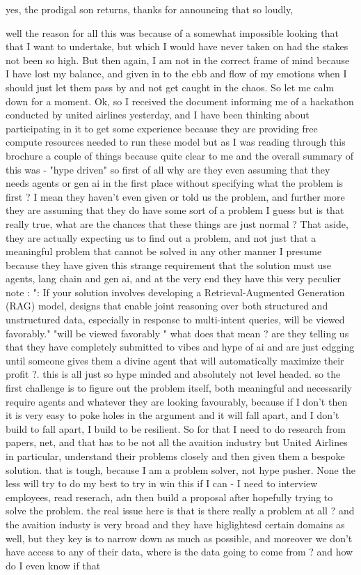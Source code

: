 
yes, the prodigal son returns, thanks for announcing that so loudly,

well the reason for all this was because of a somewhat impossible looking that that I want to undertake, but which I would have never taken on had the stakes not been so high. But then again, I am not in the correct frame of mind because I have lost my balance, and given in to the ebb and flow of my emotions when I should just let them pass by and not get caught in the chaos. So let me calm down for a moment. Ok, so I received the document informing me of a hackathon conducted by united airlines yesterday, and I have been thinking about participating in it to get some experience because they are providing free compute resources needed to run these model but as I was reading through this brochure a couple of things because quite clear to me and the overall summary of this was - "hype driven" so first of all why are they even assuming that they needs agents or gen ai in the first place without specifying what the problem is first ? I mean they haven't even given or told us the problem, and further more they are assuming that they do have some sort of a problem I guess but is that really true, what are the chances that these things are just normal ? That aside, they are actually expecting us to find out a problem, and not just that a meaningful problem that cannot be solved in any other manner I presume because they have given this strange requirement that the solution must use agents, lang chain and gen ai, and at the very end they have this very peculier note : ": If your solution involves developing a Retrieval-Augmented Generation (RAG) model, designs that enable joint reasoning over both structured and unstructured data, especially in response to multi-intent queries, will be viewed favorably." "will be viewed favorably " what does that mean ? are they telling us that they have completely submitted to vibes and hype of ai and are just edgging until someone gives them a divine agent that will automatically maximize their profit ?. this is all just so hype minded and absolutely not level headed. so the first challenge is to figure out the problem itself, both meaningful and necessarily require agents and whatever they are looking favourably, because if I don't then it is very easy to poke holes in the argument and it will fall apart, and I don't build to fall apart, I build to be resilient. So for that I need to do research from papers, net, and that has to be not all the avaition industry but United Airlines in particular, understand their problems closely and then given them a bespoke solution. that is tough, because I am a problem solver, not hype pusher. None the less will try to do my best to try in win this if I can - I need to interview employees, read reserach, adn then build a proposal after hopefully trying to solve the problem. the real issue here is that is there really a problem at all ? and the avaition industy is very broad and they have higlightesd certain domains as well, but they key is to narrow down as much as possible, and moreover we don't have access to any of their data, where is the data going to come from ? and how do I even know if that 